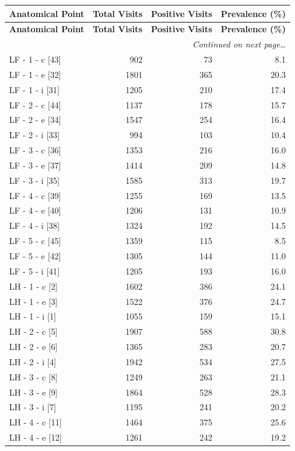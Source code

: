 \documentclass[a4paper,11pt]{article}
\begin{document}
\begin{small}
\begin{longtable}{p{5cm}rrr}
\toprule
\textbf{Anatomical Point} &
\textbf{Total Visits} &
\textbf{Positive Visits} &
\textbf{Prevalence (\%)} \\
\midrule
\endfirsthead
\toprule
\textbf{Anatomical Point} &
\textbf{Total Visits} &
\textbf{Positive Visits} &
\textbf{Prevalence (\%)} \\
\midrule
\endhead
\midrule
\multicolumn{4}{r}{\small\emph{Continued on next page\ldots}} \\
\endfoot
\bottomrule
\endlastfoot
LF - 1 - c [43] & 902 & 73 & 8.1 \\
LF - 1 - e [32] & 1801 & 365 & 20.3 \\
LF - 1 - i [31] & 1205 & 210 & 17.4 \\
LF - 2 - c [44] & 1137 & 178 & 15.7 \\
LF - 2 - e [34] & 1547 & 254 & 16.4 \\
LF - 2 - i [33] & 994 & 103 & 10.4 \\
LF - 3 - c [36] & 1353 & 216 & 16.0 \\
LF - 3 - e [37] & 1414 & 209 & 14.8 \\
LF - 3 - i [35] & 1585 & 313 & 19.7 \\
LF - 4 - c [39] & 1255 & 169 & 13.5 \\
LF - 4 - e [40] & 1206 & 131 & 10.9 \\
LF - 4 - i [38] & 1324 & 192 & 14.5 \\
LF - 5 - c [45] & 1359 & 115 & 8.5 \\
LF - 5 - e [42] & 1305 & 144 & 11.0 \\
LF - 5 - i [41] & 1205 & 193 & 16.0 \\
LH - 1 - c [2] & 1602 & 386 & 24.1 \\
LH - 1 - e [3] & 1522 & 376 & 24.7 \\
LH - 1 - i [1] & 1055 & 159 & 15.1 \\
LH - 2 - c [5] & 1907 & 588 & 30.8 \\
LH - 2 - e [6] & 1365 & 283 & 20.7 \\
LH - 2 - i [4] & 1942 & 534 & 27.5 \\
LH - 3 - c [8] & 1249 & 263 & 21.1 \\
LH - 3 - e [9] & 1864 & 528 & 28.3 \\
LH - 3 - i [7] & 1195 & 241 & 20.2 \\
LH - 4 - c [11] & 1464 & 375 & 25.6 \\
LH - 4 - e [12] & 1261 & 242 & 19.2 \\

\end{longtable}
\end{small}
\end{document}
